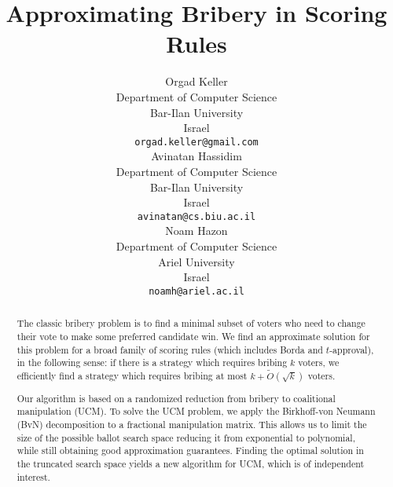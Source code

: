\documentclass[letterpaper]{article} %
\theoremstyle{definition}
\begin{document}
\title{Approximating Bribery in Scoring Rules}
\author{Orgad Keller\\
Department of Computer Science\\
Bar-Ilan University\\
Israel\\
\texttt{orgad.keller@gmail.com}\\
\And Avinatan Hassidim\\
Department of Computer Science\\
Bar-Ilan University\\
Israel\\
\texttt{avinatan@cs.biu.ac.il}\\
\And Noam Hazon\\
Department of Computer Science\\
Ariel University\\
Israel\\
\texttt{noamh@ariel.ac.il}}

%
\maketitle
\begin{abstract}
The classic bribery problem is to find a minimal subset of voters who need to change their vote to make some preferred candidate win. We find an approximate solution for this problem for a broad family of scoring rules (which includes Borda and $t$-approval), in the following sense: if there is a strategy which requires bribing $k$ voters, we efficiently find a strategy which requires bribing at most $k+\widetilde{O}(\sqrt{k})$ voters.

Our algorithm is based on a randomized reduction from bribery to coalitional manipulation (UCM). To solve the UCM problem, we apply the Birkhoff-von Neumann (BvN) decomposition to a fractional manipulation matrix. This allows us to  limit the size of the possible ballot search space reducing it from exponential to polynomial, while still obtaining good approximation guarantees. 	Finding the optimal solution in the truncated search space yields a new algorithm for UCM, which is of independent interest.
\end{abstract}
\end{document}
